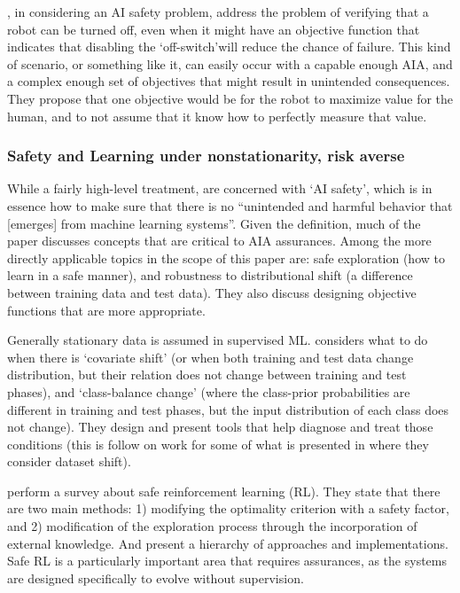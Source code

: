     \citet{Hadfield-Menell2016-ws}, in considering an AI safety problem, address the problem of verifying that a robot can be turned off, even when it might have an objective function that indicates that disabling the `off-switch'will reduce the chance of failure. This kind of scenario, or something like it, can easily occur with a capable enough AIA, and a complex enough set of objectives that might result in unintended consequences. They propose that one objective would be for the robot to maximize value for the human, and to not assume that it know how to perfectly measure that value.

\subsubsection{Safety and Learning under nonstationarity, risk averse}
    While a fairly high-level treatment, \citet{Amodei2016-xi} are concerned with `AI safety', which is in essence how to make sure that there is no ``unintended and harmful behavior that [emerges] from machine learning systems''. Given the definition, much of the paper discusses concepts that are critical to AIA assurances. Among the more directly applicable topics in the scope of this paper are: safe exploration (how to learn in a safe manner), and robustness to distributional shift (a difference between training data and test data). They also discuss designing objective functions that are more appropriate.

    Generally stationary data is assumed in supervised ML. \citet{Sugiyama2013-ci} considers what to do when there is `covariate shift' (or when both training and test data change distribution, but their relation does not change between training and test phases), and `class-balance change' (where the class-prior probabilities are different in training and test phases, but the input distribution of each class does not change). They design and present tools that help diagnose and treat those conditions (this is follow on work for some of what is presented in \citet{Quinonero-Candela2009-fj} where they consider dataset shift). 

    \citet{Garcia2015-rs} perform a survey about safe reinforcement learning (RL). They state that there are two main methods: 1) modifying the optimality criterion with a safety factor, and 2) modification of the exploration process through the incorporation of external knowledge. And present a hierarchy of approaches and implementations. Safe RL is a particularly important area that requires assurances, as the systems are designed specifically to evolve without supervision.

